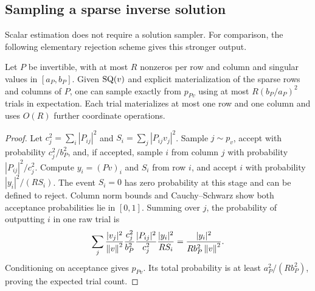 \subsection{Sampling a sparse inverse solution}\label{subsec:sampling}
Scalar estimation does not require a solution sampler. For comparison,
the following elementary rejection scheme gives this stronger output.
\begin{lemma}\label{lem:rejection}
Let $P$ be invertible, with at most $R$ nonzeros per row and column and
singular values in $[a_P,b_P]$. Given $\mathrm{SQ}(v)$ and explicit
materialization of the sparse rows and columns of $P$, one can sample exactly from $p_{Pv}$ using at most
$R(b_P/a_P)^2$ trials in expectation. Each trial materializes at most one
row and one column and uses $O(R)$ further coordinate operations.
\end{lemma}
\begin{proof}
Let $c_j^2=\sum_i|P_{ij}|^2$ and
$S_i=\sum_j|P_{ij}v_j|^2$. Sample $j\sim p_v$, accept with probability
$c_j^2/b_P^2$, and, if accepted, sample $i$ from column $j$ with probability
$|P_{ij}|^2/c_j^2$. Compute $y_i=(Pv)_i$ and $S_i$ from row $i$, and accept
$i$ with probability $|y_i|^2/(RS_i)$. The event $S_i=0$ has zero
probability at this stage and can be defined to reject. Column norm bounds
and Cauchy--Schwarz show both acceptance probabilities lie in $[0,1]$.
Summing over $j$, the probability of outputting $i$ in one raw trial is
\[
 \sum_j\frac{|v_j|^2}{\left\lVert v\right\rVert^2}\frac{c_j^2}{b_P^2}
         \frac{|P_{ij}|^2}{c_j^2}\frac{|y_i|^2}{RS_i}
       =\frac{|y_i|^2}{Rb_P^2\left\lVert v\right\rVert^2}.
\]
Conditioning on acceptance gives $p_{Pv}$. Its total probability is at least
$a_P^2/(Rb_P^2)$, proving the expected trial count.
\end{proof}


